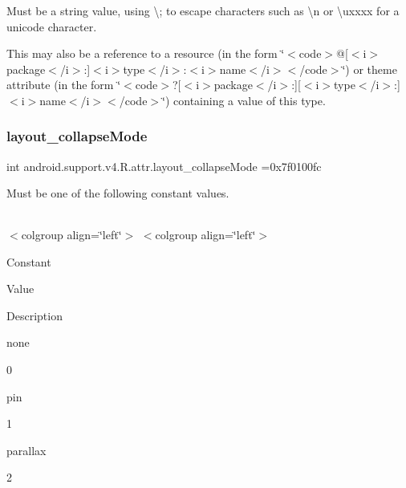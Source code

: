 Must be a string value, using \textquotesingle{}\textbackslash{};\textquotesingle{} to escape characters such as \textquotesingle{}\textbackslash{}n\textquotesingle{} or \textquotesingle{}\textbackslash{}uxxxx\textquotesingle{} for a unicode character. 

This may also be a reference to a resource (in the form \char`\"{}$<$code$>$@\mbox{[}$<$i$>$package$<$/i$>$\+:\mbox{]}$<$i$>$type$<$/i$>$\+:$<$i$>$name$<$/i$>$$<$/code$>$\char`\"{}) or theme attribute (in the form \char`\"{}$<$code$>$?\mbox{[}$<$i$>$package$<$/i$>$\+:\mbox{]}\mbox{[}$<$i$>$type$<$/i$>$\+:\mbox{]}$<$i$>$name$<$/i$>$$<$/code$>$\char`\"{}) containing a value of this type. \mbox{\label{classandroid_1_1support_1_1v4_1_1R_1_1attr_aa4465fd35e82a6ccfec13236de2e46fc}} 
\subsubsection{\texorpdfstring{layout\+\_\+collapse\+Mode}{layout\_collapseMode}}
{\footnotesize\ttfamily int android.\+support.\+v4.\+R.\+attr.\+layout\+\_\+collapse\+Mode =0x7f0100fc\hspace{0.3cm}{\ttfamily [static]}}

Must be one of the following constant values.

\tabulinesep=1mm
\begin{longtabu} spread 0pt [c]{*{0}{|X[-1]}|}
\hline
\end{longtabu}
$<$colgroup align=\char`\"{}left\char`\"{}$>$ $<$colgroup align=\char`\"{}left\char`\"{}$>$ 

Constant

Value

Description 

{\ttfamily none}

0

{\ttfamily pin}

1

{\ttfamily parallax}

2\mbox{\label{classandroid_1_1support_1_1v4_1_1R_1_1attr_a580876bd2ce4e2bd2d19c57ed9f91af1}} 
